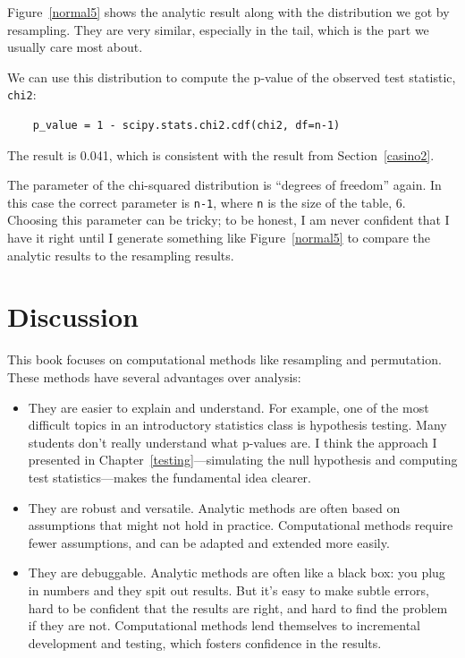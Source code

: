 \documentclass[12pt]{book}
\theoremstyle{exercise}
\begin{document}
Figure~\ref{normal5} shows the analytic result along with the
distribution we got by resampling.  They are very similar,
especially in the tail, which is the part we usually care most
about.%
%

We can use this distribution to compute the p-value of the
observed test statistic, {\tt chi2}:%
%

\begin{verbatim}
    p_value = 1 - scipy.stats.chi2.cdf(chi2, df=n-1)
\end{verbatim}

The result is 0.041, which is consistent with the result
from Section~\ref{casino2}.

The parameter of the chi-squared distribution is ``degrees of
freedom'' again.  In this case the correct parameter is {\tt n-1},
where {\tt n} is the size of the table, 6.  Choosing this parameter
can be tricky; to be honest, I am never confident that I have it
right until I generate something like Figure~\ref{normal5} to compare
the analytic results to the resampling results.%


\section{Discussion}

This book focuses on computational methods like resampling and
permutation.  These methods have several advantages over analysis:%
%
%

\begin{itemize}

\item They are easier to explain and understand.  For example, one of
  the most difficult topics in an introductory statistics class is
  hypothesis testing.  Many students don't really understand what
  p-values are.  I think the approach I presented in
  Chapter~\ref{testing}---simulating the null hypothesis and
  computing test statistics---makes the fundamental idea clearer.%
%

\item They are robust and versatile.  Analytic methods are often based
  on assumptions that might not hold in practice.  Computational
  methods require fewer assumptions, and can be adapted and extended
  more easily.%

\item They are debuggable.  Analytic methods are often like a black
  box: you plug in numbers and they spit out results.  But it's easy
  to make subtle errors, hard to be confident that the results are
  right, and hard to find the problem if they are not.  Computational
  methods lend themselves to incremental development and testing,
  which fosters confidence in the results.%

\end{itemize}
\end{document}
